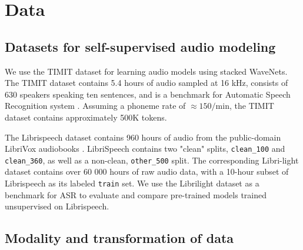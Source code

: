 \section{Data}\label{sec:data}


\subsection{Datasets for self-supervised audio modeling}
We use the TIMIT dataset for learning audio models using stacked WaveNets. 
The TIMIT dataset contains 5.4 hours of audio sampled at 16 kHz, consists of 630 speakers speaking ten sentences, and is a benchmark for Automatic Speech Recognition system \cite{garofolo_john_s_timit_1993}.
Assuming a phoneme rate of $\approx 150/\mathrm{min}$, the TIMIT dataset contains approximately 500K tokens.


The Librispeech dataset contains 960 hours of audio from the public-domain LibriVox audiobooks \cite{noauthor_librispeech_nodate}.
LibriSpeech contains two "clean" splits, \texttt{clean\_100} and \texttt{clean\_360}, as well as a non-clean, \texttt{other\_500} split. 
The corresponding Libri-light dataset contains over 60 000 hours of raw audio data, with a 10-hour subset of Librispeech as its labeled \texttt{train} set. 
We use the Librilight dataset as a benchmark for ASR to evaluate and compare pre-trained models trained unsupervised on Librispeech.


\subsection{Modality and transformation of data}\label{ssec:data-modality}

